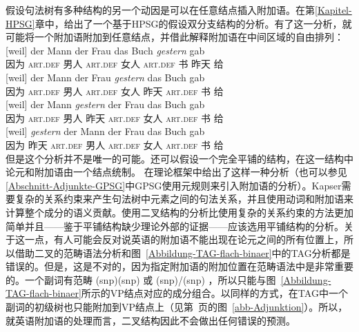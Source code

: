 假设句法树有多种结构的另一个动因是可以在任意结点插入附加语。在第\ref{Kapitel-HPSG}章中，给出了一个基于HPSG的假设双分支结构的分析。有了这一分析，就可能将一个附加语附加到任意结点，并借此解释附加语在中间区域的自由排列：
\eal
\ex 
\gll {}[weil] der Mann der Frau das Buch \emph{gestern} gab\\
	 {}\spacebr{}因为 \textsc{art}.\textsc{def} 男人 \textsc{art}.\textsc{def} 女人 \textsc{art}.\textsc{def} 书 昨天 给\\
\ex 
\gll {}[weil] der Mann der Frau \emph{gestern} das Buch gab\\
	 {}\spacebr{}因为 \textsc{art}.\textsc{def} 男人 \textsc{art}.\textsc{def} 女人 昨天 \textsc{art}.\textsc{def} 书 给\\
\ex 
\gll {}[weil] der Mann \emph{gestern} der Frau das Buch gab\\
	 {}\spacebr{}因为 \textsc{art}.\textsc{def} 男人 昨天 \textsc{art}.\textsc{def} 女人 \textsc{art}.\textsc{def} 书 给\\
\ex 
\gll {}[weil] \emph{gestern} der Mann der Frau das Buch gab\\
	 {}\spacebr{}因为 昨天 \textsc{art}.\textsc{def} 男人 \textsc{art}.\textsc{def} 女人 \textsc{art}.\textsc{def} 书 给\\
\zl
但是这个分析并不是唯一的可能。还可以假设一个完全平铺的结构，在这一结构中论元和附加语由一个结点统制。 \citet{Kasper94a}在\hpsgc 理论框架中给出了这样一种分析（也可以参见\ref{Abschnitt-Adjunkte-GPSG}中GPSG使用元规则来引入附加语的分析）。Kapser需要复杂的关系约束来产生句法树中元素之间的句法关系，并且使用动词和附加语来计算整个成分的语义贡献。使用二叉结构的分析比使用复杂的关系约束的方法更加简单并且——鉴于平铺结构缺少理论外部的证据——应该选用平铺结构的分析。关于这一点，有人可能会反对说英语的附加语不能出现在论元之间的所有位置上，所以借助二叉的范畴语法分析和图~\ref{Abbildung-TAG-flach-binaer}中的TAG分析都是错误的。但是，这是不对的，因为指定附加语的附加位置在范畴语法中是非常重要的。一个副词有范畴 (s\bs np)\bs (s\bs np) 或 (s\bs np)/(s\bs np) ，所以只能与图~\ref{Abbildung-TAG-flach-binaer}所示的VP结点对应的成分组合。以同样的方式，在TAG中一个副词的初级树也只能附加到VP结点上（见第~\pageref{abb-Adjunktion}页的图~\ref{abb-Adjunktion}）。所以，就英语附加语的处理而言，二叉结构因此不会做出任何错误的预测。
